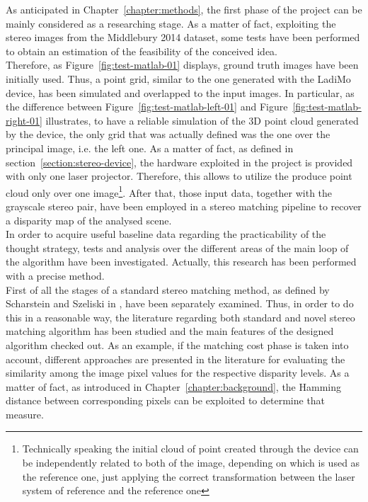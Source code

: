 As anticipated in Chapter~\ref{chapter:methods}, the first phase of the project can be mainly considered as a researching stage.
As a matter of fact, exploiting the stereo images from the Middlebury 2014 dataset, some tests have been performed to obtain an estimation of the feasibility of the conceived idea.\\
Therefore, as Figure~\ref{fig:test-matlab-01} displays, ground truth images have been initially used.
Thus, a point grid, similar to the one generated with the LadiMo device, has been simulated and overlapped to the input images.
In particular, as the difference between Figure~\ref{fig:test-matlab-left-01} and Figure~\ref{fig:test-matlab-right-01} illustrates, to have a reliable simulation of the 3D point cloud generated by the device, the only grid that was actually defined was the one over the principal image, i.e. the left one.
As a matter of fact, as defined in section~\ref{section:stereo-device}, the hardware exploited in the project is provided with only one laser projector.
Therefore, this allows to utilize the produce point cloud only over one image\footnote{Technically speaking the initial cloud of point created through the device can be independently related to both of the image, depending on which is used as the reference one, just applying the correct transformation between the laser system of reference and the reference one}.
After that, those input data, together with the grayscale stereo pair, have been employed in a stereo matching pipeline to recover a disparity map of the analysed scene.\\
In order to acquire useful baseline data regarding the practicability of the thought strategy, tests and analysis over the different areas of the main loop of the algorithm have been investigated.
Actually, this research has been performed with a precise method. \\
First of all the stages of a standard stereo matching method, as defined by Scharstein and Szeliski in \cite{Scharstein2001}, have been separately examined. 
Thus, in order to do this in a reasonable way, the literature regarding both standard and novel stereo matching algorithm has been studied and the main features of the designed algorithm checked out. 
As an example, if the matching cost phase is taken into account, different approaches are presented in the literature for evaluating the similarity among the image pixel values for the respective disparity levels. 
As a matter of fact, as introduced in Chapter~\ref{chapter:background}, the Hamming distance between corresponding pixels can be exploited to determine that measure. 
